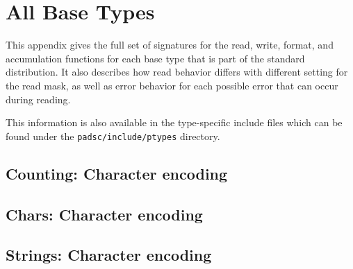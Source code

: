 \chapter{All \PADSL{} Base Types}
\label{ap:base-types}

This appendix gives the full set of signatures for the read, write,
format, and accumulation functions for each base type that is part
of the standard \pads{} distribution.  It also describes how
read behavior differs with different setting for the read mask,
as well as error behavior for each possible error that can
occur during reading.

This information is also available in the type-specific 
include files which can be found under the
{\tt padsc/include/ptypes} directory.


\section{Counting: Character encoding}

\section{Chars: Character encoding}


\section{Strings: Character encoding}


